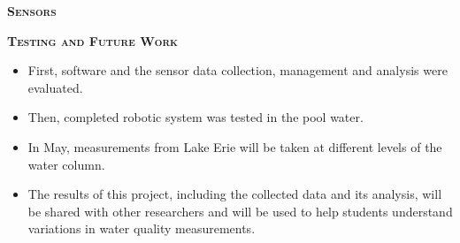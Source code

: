 \documentclass[final,t]{beamer}
\begin{document}
\begin{frame}{}
\begin{columns}
\begin{column}{.5\linewidth}
\begin{block}{\textsc{\textbf{Sensors}}}
                    \vspace*{3mm}
                \end{block}

                \begin{alertblock}{\textsc{\textbf{Testing and Future Work}}}
                    \vspace*{3mm}
                    \begin{itemize}
                    	\item First, software and the sensor data collection,
                      management and analysis were evaluated.
                    	\item Then, completed robotic system was tested in the pool
                      water.
                    	\item In May, measurements from Lake Erie will be taken at
                      different levels of the water column.
                    	\item The results of this project, including the collected
                      data and its analysis, will be shared with other researchers
                      and will be used to help students understand variations in
                      water quality measurements.
                    \end{itemize}


                    \vspace*{3mm}
                \end{alertblock}
            \end{column}


        \end{columns}
    \end{frame}
\end{document}
